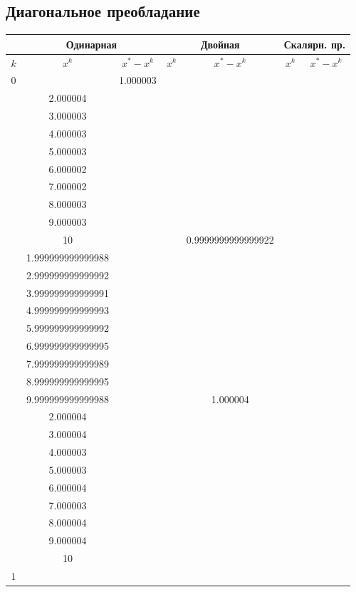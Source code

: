 \documentclass[oneside, final, 12pt]{extarticle}
\begin{document}
\subsection{Диагональное преобладание}
\begin{longtable}{|c|c|c|c|c|c|c|} \hline
	~ & \multicolumn{2}{|c|}{Одинарная} & \multicolumn{2}{|c|}{Двойная} & \multicolumn{2}{|c|}{Скалярн. пр.} \\ \hline
	\(k\) & \(x^k\) & \(x^*-x^k\) & \(x^k\) & \(x^*-x^k\) & \(x^k\) & \(x^*-x^k\) \\ \hline
	\(0\) & \( \begin{aligned}
	& 1.000003 \\ & 2.000004 \\ & 3.000003 \\ & 4.000003 \\ & 5.000003 \\ & 6.000002 \\ & 7.000002 \\ & 8.000003 \\ & 9.000003 \\ & 10 
\end{aligned} \)
& ~ 
& \( \begin{aligned}
& 0.9999999999999922 \\ & 1.999999999999988 \\ & 2.999999999999992 \\ & 3.999999999999991 \\ & 4.999999999999993 \\ & 5.999999999999992 \\ & 6.999999999999995 \\ & 7.999999999999989 \\ & 8.999999999999995 \\ & 9.999999999999988 
\end{aligned} \)
& ~ 
& \( \begin{aligned}
& 1.000004 \\ & 2.000004 \\ & 3.000004 \\ & 4.000003 \\ & 5.000003 \\ & 6.000004 \\ & 7.000003 \\ & 8.000004 \\ & 9.000004 \\ & 10 
\end{aligned} \)
& ~ 
\\ \hline
\(1\) & \( \begin{aligned}

\end{aligned}
\end{longtable}
\end{document}
